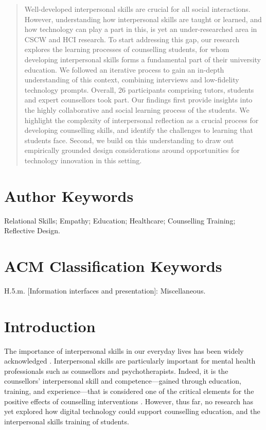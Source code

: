 \documentclass{sigchi}
\begin{document}
\begin{abstract}
Well-developed interpersonal skills are crucial for all social interactions. However, understanding how interpersonal skills are taught or learned, and how technology can play a part in this, is yet an under-researched area in CSCW and HCI research. 
%
To start addressing this gap, our research explores the learning processes of counselling students, for whom developing interpersonal skills forms a fundamental part of their university education. We followed an iterative process to gain an in-depth understanding of this context, combining interviews and low-fidelity technology prompts. Overall, 26 participants comprising tutors, students and expert counsellors took part. 
%
Our findings first provide insights into the highly collaborative and social learning process of the students. We highlight the complexity of interpersonal reflection as a crucial process for developing counselling skills, and identify the challenges to learning that students face. Second, we build on this understanding to draw out empirically grounded design considerations around opportunities for technology innovation in this setting.
\end{abstract}


\section{Author Keywords}
Relational Skills; Empathy; Education; Healthcare; Counselling Training; Reflective Design. 

\section{ACM Classification Keywords}
H.5.m. [Information interfaces and presentation]: Miscellaneous.





\section{Introduction}

The importance of interpersonal skills in our everyday lives has been widely acknowledged \cite{Cohen2006,Kennedy2011,Durlak2011,Hill2006,Stepien2006}. Interpersonal skills are particularly important for mental health professionals such as counsellors and psychotherapists. Indeed, it is the counsellors' interpersonal skill and competence---gained through education, training, and experience---that is considered one of the critical elements for the positive effects of counselling interventions \cite[p.29]{Duncan2010}. However, thus far, no research has yet explored how digital technology could support counselling education, and the interpersonal skills training of students. 
\end{document}
